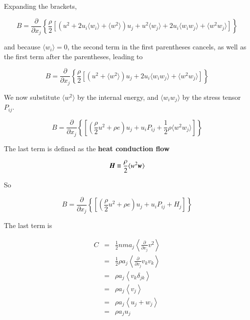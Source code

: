 \noindent Expanding the brackets, 

\begin{equation}
B = \frac{\partial}{\partial x_j}\left\{ \frac{\rho}{2}\left[(u^2 + 2u_i\langle w_i\rangle + \langle w^2\rangle)u_j + u^2\langle w_j\rangle + 2u_i\langle w_i w_j\rangle + \langle w^2 w_j \rangle \right]\right\}
\end{equation}

\noindent and because $\langle w_i \rangle = 0$, the second term in the first parentheses cancels, as well as the first term after the parentheses, leading to  

\begin{equation}
B = \frac{\partial}{\partial x_j}\left\{ \frac{\rho}{2}\left[(u^2 + \langle w^2\rangle)u_j + 2u_i\langle w_i w_j\rangle + \langle w^2 w_j \rangle \right]\right\}
\end{equation}

\noindent We now substitute $\langle w^2\rangle$ by the internal energy, and $\langle w_i w_j\rangle$ by the stress tensor $P_{ij}$. 


\begin{equation}
B = \frac{\partial}{\partial x_j}\left\{ \left[\left(\frac{\rho}{2}u^2 + \rho e\right)u_j + u_iP_{ij}  + \frac{1}{2}\rho \langle w^2 w_j \rangle \right]\right\}
\end{equation}


\noindent The last term is defined as the {\bf heat conduction flow}

\begin{equation}
{\boldsymbol{H}} \equiv  \frac{\rho}{2} \langle w^2 {\boldsymbol{w}} \rangle
\end{equation}

\noindent So 

\begin{equation}
B = \frac{\partial}{\partial x_j}\left\{ \left[\left(\frac{\rho}{2}u^2 + \rho e\right)u_j + u_iP_{ij}  + H_j \right]\right\}
\end{equation}

\noindent The last term is 


\begin{eqnarray}
C &=&\frac{1}{2}nma_j \left\langle \frac{\partial}{\partial v_j} v^2 \right\rangle \\
&=&\frac{1}{2}\rho a_j \left\langle \frac{\partial}{\partial v_j} v_k v_k \right\rangle \\
&=&\rho a_j \left\langle v_k \delta_{jk}\right\rangle \\
&=&\rho a_j \left\langle v_j\right\rangle \\
&=&\rho a_j \left\langle u_j  + w_j \right\rangle \\
&=&\rho a_j u_j \\
\end{eqnarray}

